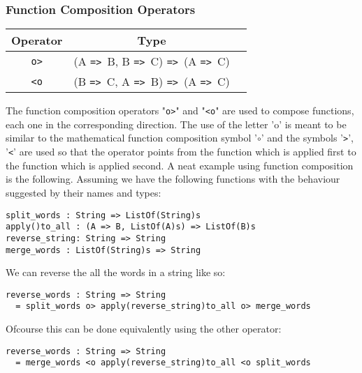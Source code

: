 \documentclass{article}
\def\ra{\texttt{=>}\ }
\begin{document}
\subsubsection{Function Composition Operators}
\begin{center}
\begin{tabular}{ |c|c|c| } 
\hline
Operator & Type \\ 
\hline
\hline
\texttt{o>} & (A \ra B, B \ra C) \ra (A \ra C) \\
\hline
\texttt{<o} & (B \ra C, A \ra B) \ra (A \ra C) \\
\hline
\end{tabular}
\end{center}
The function composition operators "\texttt{o>}" and "\texttt{<o}" are used to 
compose functions, each one in the corresponding direction. The use of the letter 'o'
is meant to be similar to the mathematical function composition symbol '\(\circ\)'
and the symbols '\texttt{>}', '\texttt{<}' are used so that the operator points from
the function which is applied first to the function which is applied second.
A neat example using function composition is the following. Assuming we have the
following functions with the behaviour suggested by their names and types: 
\begin{verbatim}
split_words : String => ListOf(String)s
apply()to_all : (A => B, ListOf(A)s) => ListOf(B)s
reverse_string: String => String
merge_words : ListOf(String)s => String
\end{verbatim}
We can reverse the all the words in a string like so:
\begin{verbatim}
reverse_words : String => String
  = split_words o> apply(reverse_string)to_all o> merge_words
\end{verbatim}
Ofcourse this can be done equivalently using the other operator:
\begin{verbatim}
reverse_words : String => String
  = merge_words <o apply(reverse_string)to_all <o split_words
\end{verbatim}
\end{document}

